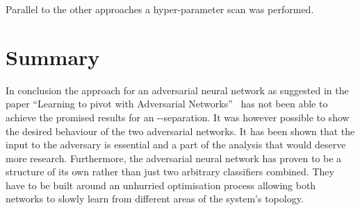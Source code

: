Parallel to the other approaches a hyper-parameter scan was performed.



\section{Summary}

In conclusion the approach for an adversarial neural network as suggested in the paper \enquote{Learning to pivot with Adversarial Networks}~\cite{Louppe:2016ylz} has not been able to achieve the promised results for an \tW-\ttbar-separation. It was however possible to show the desired behaviour of the two adversarial networks. It has been shown that the input to the adversary is essential and a part of the analysis that would deserve more research. Furthermore, the adversarial neural network has proven to be a structure of its own rather than just two arbitrary classifiers combined. They have to be built around an unhurried optimisation process allowing both networks to slowly learn from different areas of the system's topology.
